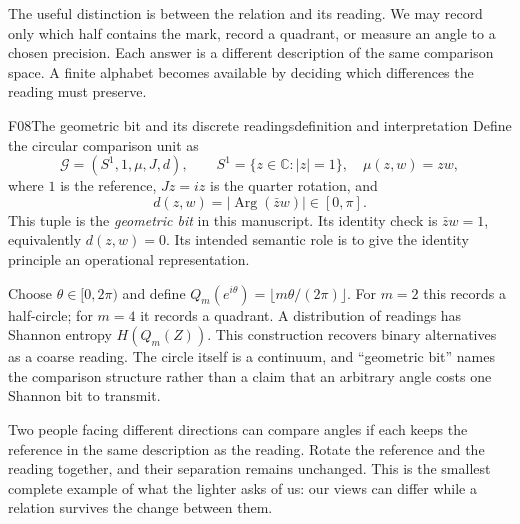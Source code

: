 \documentclass[11pt,a4paper]{article}
\newcommand{\C}{\mathbb{C}}
\DeclareMathOperator{\Arg}{Arg}
\begin{document}
The useful distinction is between the relation and its reading. We may record
only which half contains the mark, record a quadrant, or measure an angle to a
chosen precision. Each answer is a different description of the same comparison
space. A finite alphabet becomes available by deciding which differences the
reading must preserve.

\begin{formal}{F08}{The geometric bit and its discrete readings}{definition and interpretation}
Define the circular comparison unit as
\begin{equation}\label{eq:unit}
 \mathcal G=(S^1,1,\mu,J,d),\qquad
 S^1=\{z\in\C:|z|=1\},\quad \mu(z,w)=zw,
\end{equation}
where $1$ is the reference, $Jz=iz$ is the quarter rotation, and
\begin{equation}\label{eq:circle-distance}
 d(z,w)=|\Arg(\bar z w)|\in[0,\pi].
\end{equation}
This tuple is the \emph{geometric bit} in this manuscript. Its identity check is
$\bar z w=1$, equivalently $d(z,w)=0$. Its intended semantic role is to give
the identity principle an operational representation.

Choose $\theta\in[0,2\pi)$ and define
$Q_m(e^{i\theta})=\lfloor m\theta/(2\pi)\rfloor$.
For $m=2$ this records a half-circle; for $m=4$ it records a quadrant.
A distribution of readings has Shannon entropy $H(Q_m(Z))$. This construction
recovers binary alternatives as a coarse reading. The circle itself is a
continuum, and ``geometric bit'' names the comparison structure rather than a
claim that an arbitrary angle costs one Shannon bit to transmit.
\end{formal}

Two people facing different directions can compare angles if each keeps the
reference in the same description as the reading. Rotate the reference and
the reading together, and their separation remains unchanged. This is the
smallest complete example of what the lighter asks of us: our views can differ
while a relation survives the change between them.
\end{document}
